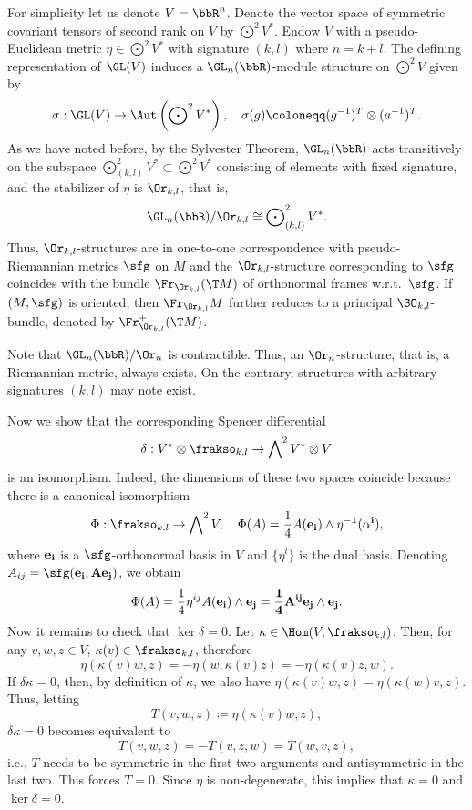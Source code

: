 \begin{example}\label{ex pseudo-riemannian structure}
    For simplicity let us denote $V=\bbR^n$. Denote the vector space of symmetric covariant tensors of second rank on $V$ by $\bigodot\nolimits^2V^\ast$. Endow $V$ with a pseudo-Euclidean metric $\eta\in \bigodot\nolimits^2V^\ast$ with signature $(k,l)$ where $n=k+l$. The defining representation of $\GL(V)$ induces a $\GL_n(\bbR)$-module structure on $\bigodot\nolimits^2 V$ given by 
    \[\sigma:\GL(V)\to \Aut\left(\bigodot\nolimits^2 V^\ast\right),\quad \sigma(g)\coloneqq (g^{-1})^T\otimes (a^{-1})^T.\label{eq 2.2.21 RS2}\]
    As we have noted before, by the Sylvester Theorem, $\GL_n(\bbR)$ acts transitively on the subspace $\bigodot\nolimits^2_{(k,l)}V^\ast\subset \bigodot\nolimits^2 V^\ast$ consisting of elements with fixed signature, and the stabilizer of $\eta$ is $\Or_{k,l}$, that is,
    \[\GL_n(\bbR)\slash \Or_{k,l}\cong \bigodot\nolimits^2_{(k,l)}V^\ast.\]
    Thus, $\Or_{k,l}$-structures are in one-to-one correspondence with pseudo-Riemannian metrics $\sfg$ on $M$ and the $\Or_{k,l}$-structure corresponding to $\sfg$ coincides with the bundle $\Fr_{\Or_{k,l}}(\T M)$ of orthonormal frames w.r.t.\ $\sfg$. If $(M,\sfg)$ is oriented, then $\Fr_{\Or_{k,l}}M$ further reduces to a principal $\SO_{k,l}$-bundle, denoted by $\Fr^+_{\Or_{k,l}}(\T M)$. 
    
    Note that $\GL_n(\bbR)\slash \Or_n$ is contractible. Thus, an $\Or_n$-structure, that is, a Riemannian metric, always exists. On the contrary, structures with arbitrary signatures $(k,l)$ may note exist. 
    
    Now we show that the corresponding Spencer differential 
    \[\delta: V^\ast\otimes \frakso_{k,l}\to \bigwedge\nolimits^2 V^\ast\otimes V\]
    is an isomorphism. Indeed, the dimensions of these two spaces coincide because there is a canonical isomorphism 
    \[\Phi: \frakso_{k,l}\to \bigwedge\nolimits^2 V,\quad \Phi(A)= \frac14 A(\bf{e}_i)\wedge \eta^{-1}(\alpha^i),\]
    where $\bf{e}_i$ is a $\sfg$-orthonormal basis in $V$ and $\{\eta^i\}$ is the dual basis. Denoting $A_{ij}=\sfg(\bf{e}_i,A\bf{e}_j)$, we obtain 
    \[\Phi(A)=\frac14 \eta^{ij}A(\bf{e}_i)\wedge\bf{e}_j=\frac14 A^{ij}\bf{e}_j\wedge\bf{e}_j.\]
    Now it remains to check that $\ker\delta=0$. Let $\kappa\in \Hom(V,\frakso_{k,l})$. Then, for any $v,w,z\in V$, $\kappa(v)\in\frakso_{k,l}$, therefore 
    \[\eta(\kappa(v)w,z)=-\eta(w,\kappa(v)z)=-\eta(\kappa(v)z,w).\]
    If $\delta\kappa=0$, then, by definition of $\kappa$, we  also have $\eta(\kappa(v)w,z)=\eta(\kappa(w)v,z)$. Thus, letting
    \[T(v,w,z)\coloneqq \eta(\kappa(v)w,z),\]
    $\delta\kappa=0$ becomes equivalent to 
    \[T(v,w,z)=-T(v,z,w)=T(w,v,z),\]
    i.e., $T$ needs to be symmetric in the first two arguments and antisymmetric in the last two. This forces $T=0$. Since $\eta$ is non-degenerate, this implies that $\kappa=0$ and $\ker\delta=0$. 
    

\end{example}
